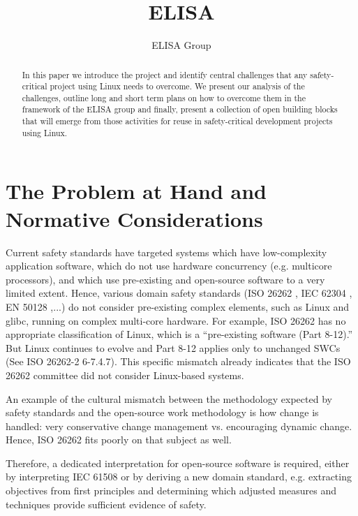 \documentclass[12pt]{../Common_files/ElisaPaper}
\title{ELISA}
\author{ELISA Group}
\begin{document}
	
\maketitle	
\begin{abstract}
In this paper we introduce the project and identify central challenges that any safety-critical project using Linux needs to overcome.
We present our analysis of the challenges, outline long and short term plans on how to overcome them in the framework of the ELISA group and finally, present a collection of open building blocks that will emerge from those activities for reuse in safety-critical development projects using Linux.
\end{abstract}

\tableofcontents

\section{The Problem at Hand and Normative Considerations}
Current safety standards have targeted systems which have low-complexity application software, which do not use hardware concurrency (e.g. multicore processors), and which use pre-existing and open-source software to a very limited extent. 
Hence, various domain safety standards (ISO 26262 \cite{ISO26262:2018}, IEC 62304 \cite{IEC62304}, EN 50128 \cite{DINEN50128},...) do not consider pre-existing complex elements, such as Linux and glibc, running on complex multi-core hardware. 
For example, ISO 26262 has no appropriate classification of Linux, which is a “pre-existing software  (Part 8-12).” 
But Linux continues to evolve and Part 8-12 applies only to unchanged SWCs (See ISO 26262-2 6-7.4.7). 
This specific mismatch already indicates that the ISO 26262 committee did not consider Linux-based systems.

An example of the cultural mismatch between the methodology expected by safety standards and the open-source work methodology is how change is handled: very conservative change management vs. encouraging dynamic change.
Hence, ISO 26262 fits poorly on that subject as well.

Therefore, a dedicated interpretation for open-source software is required, either by interpreting IEC 61508 or by deriving a new domain standard, e.g. extracting objectives from first principles and determining which adjusted measures and techniques provide sufficient evidence of safety.
\end{document}
